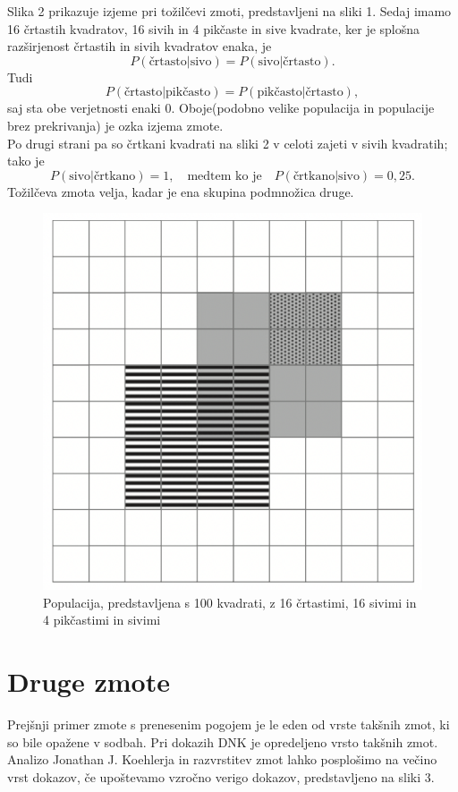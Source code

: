 \documentclass[12pt,a4paper]{amsart}
\theoremstyle{definition} %
\theoremstyle{plain} %
\begin{document}
Slika 2 prikazuje izjeme pri tožilčevi zmoti, predstavljeni na sliki 1. Sedaj imamo 16 črtastih kvadratov, 16 sivih in 4 pikčaste in sive kvadrate, ker je splošna 
razširjenost črtastih in sivih kvadratov enaka, je
\[ 
    P(\text{črtasto} \lvert \text{sivo}) = P(\text{sivo} \lvert \text{črtasto}).
\]
Tudi 
\[
    P(\text{črtasto} \lvert \text{pikčasto}) = P(\text{pikčasto} \lvert \text{črtasto}),
\]
saj sta obe verjetnosti enaki $0$. Oboje(podobno velike populacija in populacije brez prekrivanja) je ozka izjema zmote. \\
Po drugi strani pa so črtkani kvadrati na sliki 2 v celoti zajeti v sivih kvadratih; tako je 
\[
    P(\text{sivo} \lvert \text{črtkano}) = 1, \quad \text{medtem ko je} \quad P(\text{črtkano} \lvert \text{sivo}) = 0,25. 
\]
Tožilčeva zmota velja, kadar je ena skupina podmnožica druge.

\begin{figure}[!ht]\label{fig:slika2}
    \centering
    \includegraphics[scale=0.45]{slika2.png}
    \caption{Populacija, predstavljena s 100 kvadrati, z 16 črtastimi, 16 sivimi in 4 pikčastimi in sivimi}\vspace{2mm}
\end{figure}
 
\section{Druge zmote}
Prejšnji primer zmote s prenesenim pogojem je le eden od vrste takšnih zmot, ki so bile opažene v sodbah. Pri dokazih DNK je opredeljeno vrsto 
takšnih zmot. Analizo Jonathan J. Koehlerja in razvrstitev zmot lahko posplošimo na večino vrst dokazov, če upoštevamo vzročno verigo dokazov, predstavljeno 
na sliki 3.
\end{document}
